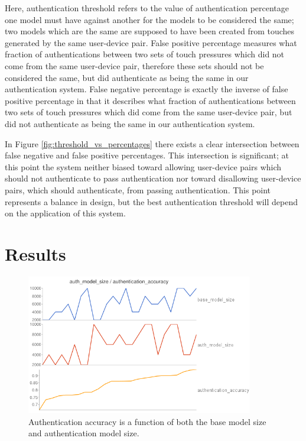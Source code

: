 \documentclass{acm_proc_article-sp}
\begin{document}
Here, authentication threshold refers to the value of authentication percentage one model must have against another for the models to be considered the same; two models which are the same are supposed to have been created from touches generated by the same user-device pair.
False positive percentage measures what fraction of authentications between two sets of touch pressures which did not come from the same user-device pair, therefore these sets should not be considered the same, but did authenticate as being the same in our authentication system.
False negative percentage is exactly the inverse of false positive percentage in that it describes what fraction of authentications between two sets of touch pressures which did come from the same user-device pair, but did not authenticate as being the same in our authentication system.

In Figure \ref{fig:threshold_vs_percentages} there exists a clear intersection between false negative and false positive percentages. This intersection is significant; at this point the system neither biased toward allowing user-device pairs which should not authenticate to pass authentication nor toward disallowing user-device pairs, which should authenticate, from passing authentication. This point represents a balance in design, but the best authentication threshold will depend on the application of this system.

\section{Results}
\label{sec:results}

\begin{figure}
\centering
\includegraphics[width=3.9in]{authentication_accuracy_vs_model_size.png}
\caption{Authentication accuracy is a function of both the base model size and authentication model size.}
\label{fig:authentication_accuracy}
\end{figure}
\end{document}
